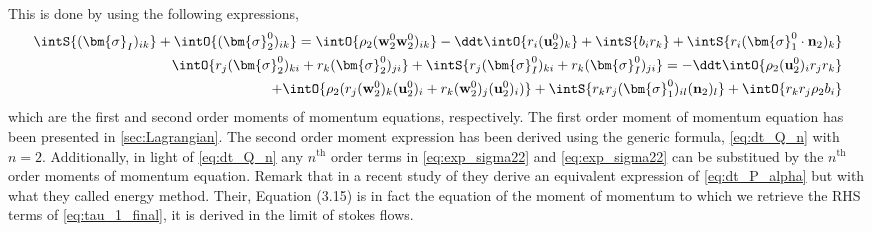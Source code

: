 This is done by using the following expressions, 
\begin{align}
    \intS{ 
    (\bm{\sigma}_I)_{ik}
    }
    +\intO{ 
    (\bm{\sigma}_2^0)_{ik}
    }
    = 
    \intO{ \rho_2 
    (\textbf{w}_2^0\textbf{w}_2^0  )_{ik}
    }
    -\ddt \intO{ r_i (\textbf{u}^0_2)_k }
    +\intS{ 
        b_{i}
        r_k 
    }
    +\intS{ 
     r_i (\bm{\sigma}_1^0 \cdot \textbf{n}_2)_{k}
    }
    \label{eq:dt_P_alpha}\\
    \intO{ r_{j}(\bm{\sigma}^0_2)_{ki}+r_{k}(\bm{\sigma}^0_2)_{ji}}
    +\intS{ r_{j}(\bm{\sigma}^0_I)_{ki}+r_{k}(\bm{\sigma}_I^0)_{ji}}
    = 
    - \ddt\intO{ \rho_2 (\textbf{u}_2^0)_i r_j r_k }\nonumber\\
    + \intO{ \rho_2 (r_{j} (\textbf{w}_2^0)_k (\textbf{u}^0_2)_i + r_k (\textbf{w}_2^0)_j (\textbf{u}^0_2)_i)}
    +\intS{  r_{k}r_{j} (\bm{\sigma}_1^0)_{il} (\textbf{n}_2)_l }
    + \intO{ r_{k}r_{j}  \rho_2 b_i } 
    \label{eq:dt_P2_alpha}
\end{align}
which are the first and second order moments of momentum equations, respectively. 
The first order moment of momentum equation has been presented in \ref{sec:Lagrangian}. 
The second order moment expression has been derived using the generic formula, \ref{eq:dt_Q_n} with $n = 2$.
Additionally, in light of \ref{eq:dt_Q_n} any $n^\text{th}$ order terms in \ref{eq:exp_sigma22} and \ref{eq:exp_sigma22} can be substitued by the $n^\text{th}$ order moments of momentum equation. 
Remark that in a recent study of \citet{dolata2020heterogeneous} they derive an equivalent expression of \ref{eq:dt_P_alpha}  but with what they called energy method.  
Their, Equation (3.15) is in fact the equation of the moment of momentum to which we retrieve the RHS terms of \ref{eq:tau_1_final}, it is derived in the limit of stokes flows.




